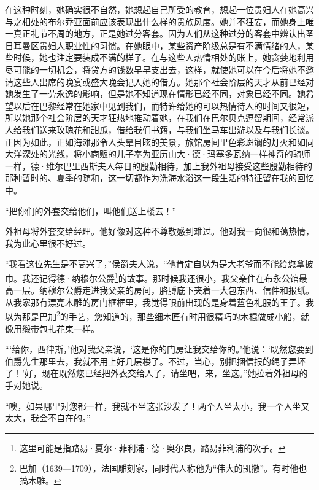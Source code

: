 \par 在这种时刻，她确实很不自然，她想起自己所受的教育，想起一位贵妇人在她高兴与之相处的布尔乔亚面前应该表现出什么样的贵族风度。她并不狂妄，而她身上唯一真正礼节不周的地方，正是她过分客套。因为人们从这种过分的客套中辨认出圣日耳曼区贵妇人职业性的习惯。在她眼中，某些资产阶级总是有不满情绪的人，某些时候，她也注定要装成不满的样子。在与这些人热情相处的账上，她贪婪地利用尽可能的一切机会，将贷方的钱数早早支出去，这样，就使她可以在今后将她不邀请这些人出席的晚宴或盛大晚会记入她的借方。她那个社会阶层的天才从前已经对她发生了一劳永逸的影响，但是她不知道现在情形已经不同，对象已经不同。她希望以后在巴黎经常在她家中见到我们，而特许给她的可以热情待人的时间又很短，所以她那个社会阶层的天才狂热地推动着她，在我们在巴尔贝克逗留期间，经常派人给我们送来玫瑰花和甜瓜，借给我们书籍，与我们坐马车出游以及与我们长谈。正因为如此，正如海滩那令人头晕目眩的美景，旅馆房间里色彩斑斓的灯火和如同大洋深处的光线，将小商贩的儿子奉为亚历山大·德·玛塞多瓦纳一样神奇的骑师一样，德·维尔巴里西斯夫人每日的殷勤相待，加上我外祖母接受这些殷勤相待的那种暂时的、夏季的随和，这一切都作为洗海水浴这一段生活的特征留在我的回忆中。
\par “把你们的外套交给他们，叫他们送上楼去！”
\par 外祖母将外套交给经理。他好像对这种不尊敬感到难过。他对我一向很和蔼热情，我为此心里很不好过。
\par “我看这位先生是不高兴了，”侯爵夫人说，“他肯定自以为是大老爷而不能给您拿披巾。我还记得德·纳穆尔公爵\footnote{这里可能是指路易·夏尔·菲利浦·德·奥尔良，路易菲利浦的次子。}的故事。那时候我还很小，我父亲住在布永公馆最高一层。纳穆尔公爵走进我父亲的房间，胳膊底下夹着一大包东西、信件和报纸。从我家那有漂亮木雕的房门框框里，我觉得眼前出现的是身着蓝色礼服的王子。我以为那是巴加\footnote{巴加（1639—1709），法国雕刻家，同时代人称他为“伟大的凯撒”。有时他也搞木雕。}的手艺，您知道的，那些细木匠有时用很精巧的木棍做成小船，就像用缎带包扎花束一样。
\par “‘给你，西律斯，’他对我父亲说，‘这是你的门房让我交给你的。’他说：‘既然您要到伯爵先生那里去，我就不用上好几层楼了。不过，当心，别把捆信报的绳子弄坏了！’好，现在既然您已经把外衣交给人了，请坐吧，来，坐这。”她拉着外祖母的手对她说。
\par “噢，如果哪里对您都一样，我就不坐这张沙发了！两个人坐太小，我一个人坐又太大，我会不自在的。”
